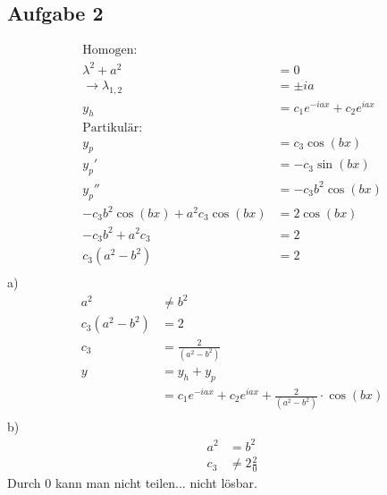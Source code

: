 \documentclass{article}
\begin{document}
\subsection*{Aufgabe 2}
\begin{align*}
    \text{Homogen:}\\
    \lambda^2+a^2&=0\\
    \rightarrow\lambda_{1,2} &= \pm ia\\
    y_h &= c_1 e^{-iax}+c_2e^{iax}\\
    \text{Partikulär:}\\
    y_p &= c_3 \cos(bx)\\
    y_p' &= -c_3\sin(bx)\\
    y_p''&=-c_3b^2\cos(bx)\\
    -c_3b ^2\cos(bx)+a^2c_3\cos(bx)&=2\cos(bx)\\
    -c_3b^2+a^2c_3&=2\\
    c_3(a^2-b^2)&=2\\
\end{align*}
a)
\begin{align*}
    a^2 &\neq b^2\\
    c_3(a^2-b^2)&=2\\
    c_3 &= \frac{2}{(a^2-b^2)}\\
    y&=y_h+y_p\\
    &= c_1e^{-iax}+c_2e^{iax}+\frac{2}{(a^2-b^2)}\cdot \cos(bx)\\
\end{align*}
b)
\begin{align*}
    a^2 &= b^2\\
    c_3 &\neq 2\frac{2}{0}
\end{align*}
Durch 0 kann man nicht teilen... nicht lösbar.
\end{document}
